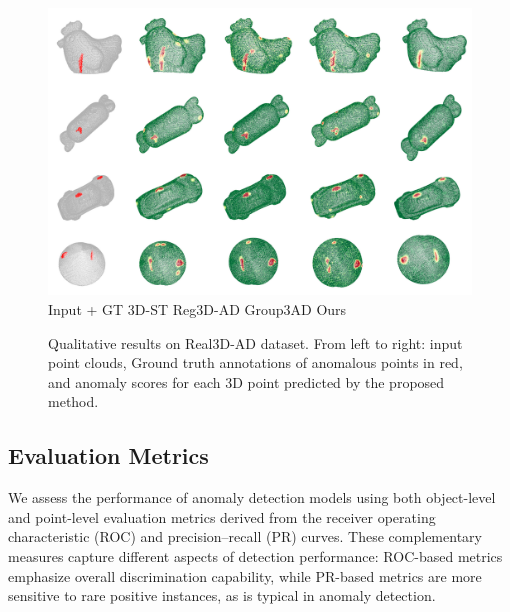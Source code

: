 \begin{figure}[!ht]
    \includegraphics[width=\linewidth]{figs/real3d}
    Input + GT \hspace{1.2cm} 3D-ST \cite{bergmann2023anomaly} \hspace{1.3cm} Reg3D-AD \cite{liu2023real3d} \hspace{1.3cm} Group3AD   \cite{zhu2024towards} \hspace{1.7cm} Ours \hspace{1.5cm}
    \caption{Qualitative results on Real3D-AD dataset. From left to right: input point clouds, Ground truth annotations of anomalous points in red, and anomaly scores for each 3D point predicted by the proposed method.}
    \label{fig:real3d}
\end{figure}

\subsection{Evaluation Metrics}

We assess the performance of anomaly detection models using both object-level and point-level evaluation metrics derived from the receiver operating characteristic (ROC) and precision–recall (PR) curves. These complementary measures capture different aspects of detection performance: ROC-based metrics emphasize overall discrimination capability, while PR-based metrics are more sensitive to rare positive instances, as is typical in anomaly detection.

